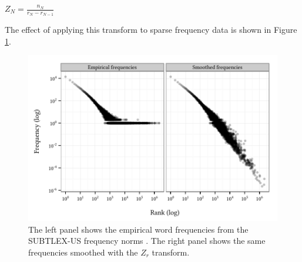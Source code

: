 \begin{unlabeledexample}
$\displaystyle Z_N = \frac{n_N}{r_N - r_{N - 1}}$
\end{unlabeledexample}

\noindent The effect of applying this transform to sparse frequency data is shown in Figure \ref{subtlex}.

\begin{figure}
\centering
\includegraphics{zr.pdf}
\caption{The left panel shows the empirical word frequencies from the SUBTLEX-US frequency norms \citep{Brysbaert2009}. The right panel shows the same frequencies smoothed with the $Z_r$ transform.}
\label{subtlex}
\end{figure}
